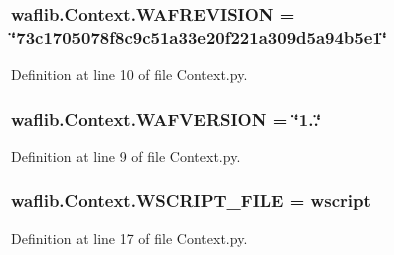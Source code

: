 \subsubsection[{\texorpdfstring{W\+A\+F\+R\+E\+V\+I\+S\+I\+ON}{WAFREVISION}}]{ waflib.\+Context.\+W\+A\+F\+R\+E\+V\+I\+S\+I\+ON = \char`\"{}73c1705078f8c9c51a33e20f221a309d5a94b5e1\char`\"{}}\hypertarget{namespacewaflib_1_1_context_a81bc2e1e3be69bd0b93e595c6845efc4}{}\label{namespacewaflib_1_1_context_a81bc2e1e3be69bd0b93e595c6845efc4}


Definition at line 10 of file Context.\+py.

\subsubsection[{\texorpdfstring{W\+A\+F\+V\+E\+R\+S\+I\+ON}{WAFVERSION}}]{ waflib.\+Context.\+W\+A\+F\+V\+E\+R\+S\+I\+ON = \char`\"{}1..\char`\"{}}\hypertarget{namespacewaflib_1_1_context_a5665a27322d480799baf9b22ebcb68c8}{}\label{namespacewaflib_1_1_context_a5665a27322d480799baf9b22ebcb68c8}


Definition at line 9 of file Context.\+py.

\subsubsection[{\texorpdfstring{W\+S\+C\+R\+I\+P\+T\+\_\+\+F\+I\+LE}{WSCRIPT_FILE}}]{ waflib.\+Context.\+W\+S\+C\+R\+I\+P\+T\+\_\+\+F\+I\+LE = \textquotesingle{}wscript\textquotesingle{}}\hypertarget{namespacewaflib_1_1_context_a72aecfa9a0be747d8b1874bd467b5ec3}{}\label{namespacewaflib_1_1_context_a72aecfa9a0be747d8b1874bd467b5ec3}


Definition at line 17 of file Context.\+py.

